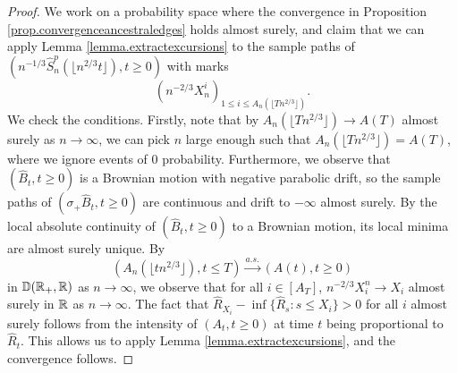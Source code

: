 \begin{proof}
We work on a probability space where the convergence in Proposition \ref{prop.convergenceancestraledges} holds almost surely, and claim that we can apply Lemma \ref{lemma.extractexcursions} to the sample paths of $\left(n^{-1/3}\hat{S}^{p}_n\left(\lfloor n^{2/3}t\rfloor\right),t \geq 0\right)$ with marks $$\left(n^{-2/3}X_n^i\right)_{1\leq i\leq A_n\left(\lfloor T n^{2/3}\rfloor\right)}.$$ We check the conditions.
Firstly, note that by $A_n\left(\lfloor T n^{2/3}\rfloor\right)\to A\left(T\right)$ almost surely as $n\to \infty$, we can pick $n$ large enough such that $A_n\left(\lfloor T n^{2/3}\rfloor\right)=A\left(T\right)$, where we ignore events of $0$ probability. Furthermore, we observe that $(\hat{B}_t,t\geq 0)$ is a Brownian motion with negative parabolic drift, so the sample paths of $(\sigma_+\hat{B}_t,t\geq 0)$ are continuous and drift to $-\infty$ almost surely. By the local absolute continuity of $(\hat{B}_t,t\geq 0)$ to a Brownian motion, its local minima are almost surely unique. By 
$$\left(A_n\left(\lfloor t n^{2/3}\rfloor\right), t\leq T\right) \overset{a.s.}{\to}\left(A\left(t\right),t\geq 0\right)$$
in ${\mathbb D}({\mathbb R}_+,{\mathbb R})$ as $n\to \infty$, we observe that for all $i\in [A_T]$, $n^{-2/3}X_i^n\to X_i$ almost surely in ${\mathbb R}$ as $n\to \infty$. The fact that $\hat{R}_{X_i}-\inf\{\hat{R}_s:s\leq X_i\}>0$ for all $i$ almost surely follows from the intensity of $(A_t,t\geq 0)$ at time $t$ being proportional to $\hat{R}_t$. This allows us to apply Lemma \ref{lemma.extractexcursions}, and the convergence follows.
\end{proof}

